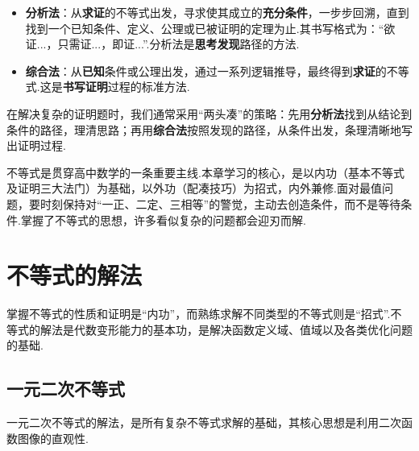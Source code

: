 \begin{definition}[分析法与综合法]
	\begin{itemize}
		\item \textbf{分析法}：从\textbf{求证}的不等式出发，寻求使其成立的\textbf{充分条件}，一步步回溯，直到找到一个已知条件、定义、公理或已被证明的定理为止.其书写格式为：“欲证...，只需证...，即证...”.分析法是\textbf{思考发现}路径的方法.
		\item \textbf{综合法}：从\textbf{已知}条件或公理出发，通过一系列逻辑推导，最终得到\textbf{求证}的不等式.这是\textbf{书写证明}过程的标准方法.
	\end{itemize}
\end{definition}

\begin{note}[方法论]
	在解决复杂的证明题时，我们通常采用“两头凑”的策略：先用\textbf{分析法}找到从结论到条件的路径，理清思路；再用\textbf{综合法}按照发现的路径，从条件出发，条理清晰地写出证明过程.
\end{note}


\begin{conclusion}
	不等式是贯穿高中数学的一条重要主线.本章学习的核心，是以内功（基本不等式及证明三大法门）为基础，以外功（配凑技巧）为招式，内外兼修.面对最值问题，要时刻保持对“一正、二定、三相等”的警觉，主动去创造条件，而不是等待条件.掌握了不等式的思想，许多看似复杂的问题都会迎刃而解.
\end{conclusion}

\section{不等式的解法}

掌握不等式的性质和证明是“内功”，而熟练求解不同类型的不等式则是“招式”.不等式的解法是代数变形能力的基本功，是解决函数定义域、值域以及各类优化问题的基础.

\subsection{一元二次不等式}

一元二次不等式的解法，是所有复杂不等式求解的基础，其核心思想是利用二次函数图像的直观性.

